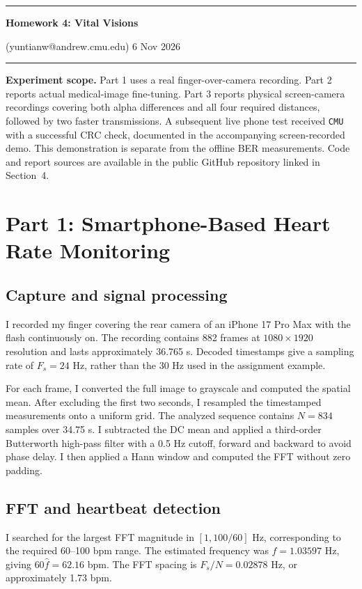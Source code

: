 \documentclass[10pt,a4paper,twoside]{article}
\begin{document}
\begin{center}
\hrule
\vspace{.4cm}
{\bf {\Huge Homework 4: Vital Visions}}
\vspace{.2cm}
\end{center}
 (yuntianw@andrew.cmu.edu) \hfill 6 Nov 2026\par
\hrule
\renewcommand{\contentsname}{Table of Contents}
\tableofcontents
\vspace{.4cm}
\noindent\textbf{Experiment scope.} Part 1 uses a real finger-over-camera recording. Part 2 reports actual medical-image fine-tuning. Part 3 reports physical screen-camera recordings covering both alpha differences and all four required distances, followed by two faster transmissions. A subsequent live phone test received \texttt{CMU} with a successful CRC check, documented in the accompanying screen-recorded demo. This demonstration is separate from the offline BER measurements. Code and report sources are available in the public GitHub repository linked in Section~4.

\clearpage
\section{Part 1: Smartphone-Based Heart Rate Monitoring}
\subsection{Capture and signal processing}
I recorded my finger covering the rear camera of an iPhone 17 Pro Max with the flash continuously on. The recording contains 882 frames at $1080\times1920$ resolution and lasts approximately 36.765 s. Decoded timestamps give a sampling rate of $F_s=24$ Hz, rather than the 30 Hz used in the assignment example.

For each frame, I converted the full image to grayscale and computed the spatial mean. After excluding the first two seconds, I resampled the timestamped measurements onto a uniform grid. The analyzed sequence contains $N=834$ samples over 34.75 s. I subtracted the DC mean and applied a third-order Butterworth high-pass filter with a 0.5 Hz cutoff, forward and backward to avoid phase delay. I then applied a Hann window and computed the FFT without zero padding.

\subsection{FFT and heartbeat detection}
I searched for the largest FFT magnitude in $[1,100/60]$ Hz, corresponding to the required 60--100 bpm range. The estimated frequency was $\hat f=1.03597$ Hz, giving $60\hat f=62.16$ bpm. The FFT spacing is $F_s/N=0.02878$ Hz, or approximately 1.73 bpm.
\end{document}
